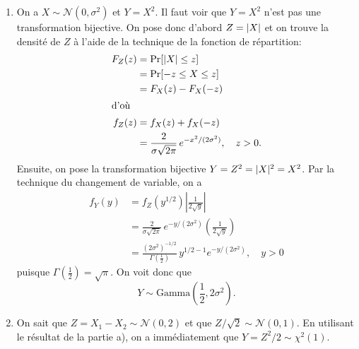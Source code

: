 \begin{solution}{2.10}
    \begin{enumerate}
    \item On a $X \sim \mathcal{N}(0, \sigma^2)$ et $Y = X^2$. Il faut voir que
      $Y = X^2$ n'est pas une transformation bijective. On pose donc
      d'abord $Z = \lvert X \rvert$ et on trouve la densité de $Z$ à l'aide de
      la technique de la fonction de répartition:
      \begin{align*}
        F_Z(z) &= \mathrm{Pr} [ \lvert X \rvert\leq z ]\\
        &= \mathrm{Pr} [ -z \leq X \leq z ]\\
        &= F_X(z) - F_X(-z) \\
        \intertext{d'où}
        f_Z(z) &= f_X(z) + f_X(-z)\\
        &= \frac{2}{\sigma \sqrt{2\pi}}\, e^{-x^2/(2 \sigma^2)},
        \quad z > 0.
      \end{align*}
      Ensuite, on pose la transformation bijective $Y = Z^2 =
      \lvert X \rvert^2 = X^2$. Par la technique du changement de variable, on
      a
      \begin{align*}
        f_Y(y) &= f_Z(y^{1/2}) \left| \frac{1}{2\sqrt{y}} \right| \\
        &= \frac{2}{\sigma \sqrt{2\pi}}\,
        e^{-y/(2 \sigma^2)} \left( \frac{1}{2\sqrt{y}} \right) \\
        &= \frac{(2 \sigma^2)^{-1/2}}{\Gamma(\frac{1}{2})}\,
        y^{1/2 - 1} e^{-y/(2 \sigma^2)}, \quad y > 0
      \end{align*}
      puisque $\Gamma(\frac{1}{2}) = \sqrt{\pi}$. On voit donc que
      \begin{equation*}
        Y \sim \text{Gamma}\left(\frac{1}{2}, 2\sigma^2\right).
      \end{equation*}
    \item On sait que $Z = X_1 - X_2 \sim \mathcal{N}(0, 2)$ et que $Z/\sqrt{2}
      \sim \mathcal{N}(0, 1)$. En utilisant le résultat de la partie a), on a
      immédiatement que $Y = Z^2/2 \sim \chi^2(1)$.
    \end{enumerate}
  
\end{solution}
